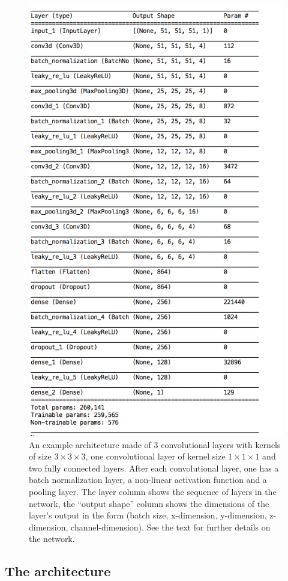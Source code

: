 \documentclass[11pt]{article}
\begin{document}
\begin{figure}[t!]
\centering
\includegraphics[width=0.65\columnwidth]{arch.png}
\caption{An example architecture made of 3 convolutional layers with kernels of size $3\times3\times3$, one convolutional layer of kernel size $1\times1\times1$ and two fully connected layers. After each convolutional layer, one has a batch normalization layer, a non-linear activation function and a pooling layer. The layer column shows the sequence of layers in the network, the ``output shape'' column shows the dimensions of the layer's output in the form (batch size, x-dimension, y-dimension, z-dimension, channel-dimension). See the text for further details on the network.}
\label{fig:CNN_architecture}
\end{figure}

\subsection{The architecture}
\end{document}
